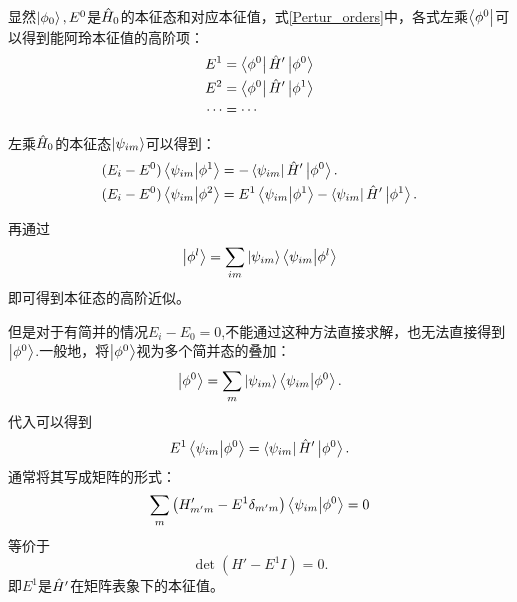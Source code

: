 显然$\left|\phi_0\right>,E^0$是$\hat{H}_0$的本征态和对应本征值，式\ref{Pertur_orders}中，各式左乘$\left<\phi^0\right|$可以得到能阿玲本征值的高阶项：
\begin{equation}
    \begin{aligned}
    E^1&=\left<\phi^0\right|\hat{H}'\left|\phi^0\right>\\
    E^2&=\left<\phi^0\right|\hat{H}'\left|\phi^1\right>\\
    \cdots&=\cdots
    \end{aligned}
\end{equation}

左乘$\hat{H}_0$的本征态$\left|\psi_{im}\right>$可以得到：
\begin{equation}
    \begin{aligned}
        (E_i-E^0)\left<\psi_{im}\middle|\phi^1\right>&=-\left<\psi_{im}\right|\hat{H}'\left|\phi^0\right>.\\
        (E_i-E^0)\left<\psi_{im}\middle|\phi^2\right>&=E^1\left<\psi_{im}\middle|\phi^1\right>-\left<\psi_{im}\right|\hat{H}'\left|\phi^1\right>.
    \end{aligned}
\end{equation}

再通过
\begin{equation}
    \left|\phi^l\right>=\sum_{im}\left|\psi_{im}\right>\left<\psi_{im}\middle|\phi^l\right>
\end{equation}
即可得到本征态的高阶近似。

但是对于有简并的情况$E_i-E_0=0$,不能通过这种方法直接求解，也无法直接得到$\left|\phi^0\right>$.一般地，将$\left|\phi^0\right>$视为多个简并态的叠加：
\begin{equation}
    \left|\phi^0\right>=\sum_{m}\left|\psi_{im}\right>\left<\psi_{im}\middle|\phi^0\right>.
\end{equation}
代入可以得到
\begin{equation}
    E^1\left<\psi_{im}\middle|\phi^0\right>=\left<\psi_{im}\right|\hat{H}'\left|\phi^0\right>.
\end{equation}
通常将其写成矩阵的形式：
\begin{equation}
    \sum_m\left(H'_{m'm}-E^1\delta_{m'm}\right)\left<\psi_{im}\middle|\phi^0\right>=0
\end{equation}
等价于
\begin{equation}
    \det\left(H'-E^1I\right)=0.
\end{equation}
即$E^1$是$\hat{H}'$在矩阵表象下的本征值。

